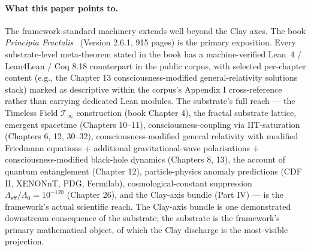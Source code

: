 \documentclass[11pt,a4paper]{amsart}
\theoremstyle{plain}
\theoremstyle{definition}
\begin{document}
\paragraph{What this paper points to.} The framework-standard machinery extends well beyond the Clay axes. The book \emph{Principia Fractalis}~\cite{cohen2026book} (Version 2.6.1, 915 pages) is the primary exposition. Every substrate-level meta-theorem stated in the book has a machine-verified Lean~4 / Lean4Lean / Coq 8.18 counterpart in the public corpus, with selected per-chapter content (e.g., the Chapter 13 consciousness-modified general-relativity solutions stack) marked as descriptive within the corpus's Appendix I cross-reference rather than carrying dedicated Lean modules. The substrate's full reach --- the Timeless Field $\mathcal{T}_\infty$ construction (book Chapter 4), the fractal substrate lattice, emergent spacetime (Chapters 10--11), consciousness-coupling via IIT-saturation (Chapters 6, 12, 30--32), consciousness-modified general relativity with modified Friedmann equations + additional gravitational-wave polarisations + consciousness-modified black-hole dynamics (Chapters 8, 13), the account of quantum entanglement (Chapter 12), particle-physics anomaly predictions (CDF II, XENONnT, PDG, Fermilab), cosmological-constant suppression $\Lambda_{\textsf{eff}}/\Lambda_0 = 10^{-120}$ (Chapter 26), and the Clay-axis bundle (Part IV) --- is the framework's actual scientific reach. The Clay-axis bundle is one demonstrated downstream consequence of the substrate; the substrate is the framework's primary mathematical object, of which the Clay discharge is the most-visible projection.
\end{document}

